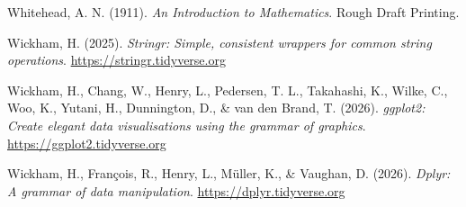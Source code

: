 \documentclass[
  letterpaper,
  12pt]{article}
\newlength{\cslhangindent}
\newenvironment{CSLReferences}[2] %
 {\begin{list}{}{%
  \setlength{\itemindent}{0pt}
  \setlength{\leftmargin}{0pt}
  \setlength{\parsep}{0pt}
  \ifodd #1
   \setlength{\leftmargin}{\cslhangindent}
   \setlength{\itemindent}{-1\cslhangindent}
  \fi
  \setlength{\itemsep}{#2\baselineskip}}}
 {\end{list}}
\begin{document}
\begin{CSLReferences}{1}{0}
Whitehead, A. N. (1911). \emph{An {Introduction} to {Mathematics}}.
Rough Draft Printing.

Wickham, H. (2025). \emph{Stringr: Simple, consistent wrappers for
common string operations}. \url{https://stringr.tidyverse.org}

Wickham, H., Chang, W., Henry, L., Pedersen, T. L., Takahashi, K.,
Wilke, C., Woo, K., Yutani, H., Dunnington, D., \& van den Brand, T.
(2026). \emph{ggplot2: Create elegant data visualisations using the
grammar of graphics}. \url{https://ggplot2.tidyverse.org}

Wickham, H., François, R., Henry, L., Müller, K., \& Vaughan, D. (2026).
\emph{Dplyr: A grammar of data manipulation}.
\url{https://dplyr.tidyverse.org}

\end{CSLReferences}
\end{document}
